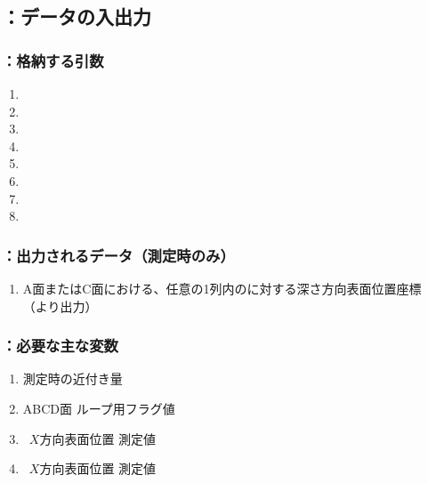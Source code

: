 \subsection{\DLtwoAC：データの入出力}

\subsubsection{\DLtwoAC：格納する引数}
\begin{enumerate}[label*=\sarrow]
\item \PMACFaceSelectionFlag
\item \PMDimpleAngle
\item \PMDimpleHorizontalPitch
\item \PMDimpleOddRowLength
\item \PMDimpleEvenRowLength
\item \PMDimpleRowNum
\item \PMDimpleDepth
\item \PMTopEndACIDMeasuredValue
\end{enumerate}

\subsubsection{\DLtwoAC：出力されるデータ（測定時のみ）}
\begin{enumerate}[label*=\sarrow]
\item A面またはC面における、任意の1列内の\Dimple に対する深さ方向表面位置座標\\
（\DMLthreeAC より出力）
\end{enumerate}

\subsubsection{\DLtwoAC：必要な主な変数}
\begin{enumerate}[label*=\sarrow]
\item \TouchSensorProbe 測定時の近付き量
\item ABCD面 ループ用フラグ値
\item \AfaceDimple~$X$方向表面位置 測定値
\item \CfaceDimple~$X$方向表面位置 測定値
\end{enumerate}


